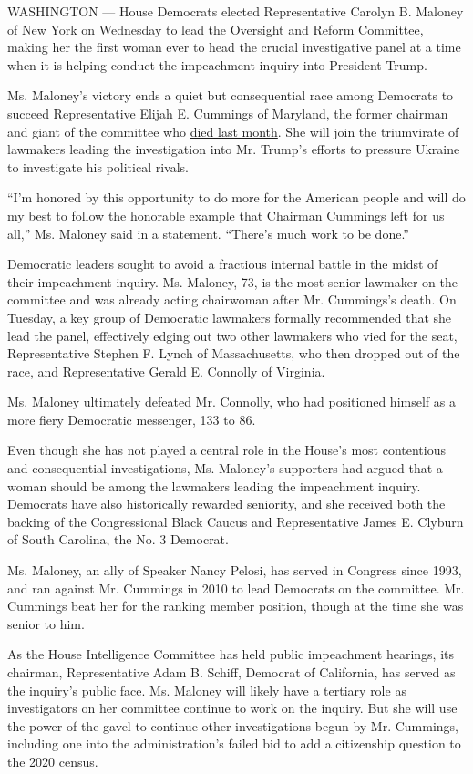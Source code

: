 WASHINGTON --- House Democrats elected Representative Carolyn B. Maloney
of New York on Wednesday to lead the Oversight and Reform Committee,
making her the first woman ever to head the crucial investigative panel
at a time when it is helping conduct the impeachment inquiry into
President Trump.

Ms. Maloney's victory ends a quiet but consequential race among
Democrats to succeed Representative Elijah E. Cummings of Maryland, the
former chairman and giant of the committee who
\href{https://www.nytimes.com/2019/10/17/us/politics/elijah-cummings-death-illness.html}{died
last month}. She will join the triumvirate of lawmakers leading the
investigation into Mr. Trump's efforts to pressure Ukraine to
investigate his political rivals.

``I'm honored by this opportunity to do more for the American people and
will do my best to follow the honorable example that Chairman Cummings
left for us all,'' Ms. Maloney said in a statement. ``There's much work
to be done.''

Democratic leaders sought to avoid a fractious internal battle in the
midst of their impeachment inquiry. Ms. Maloney, 73, is the most senior
lawmaker on the committee and was already acting chairwoman after Mr.
Cummings's death. On Tuesday, a key group of Democratic lawmakers
formally recommended that she lead the panel, effectively edging out two
other lawmakers who vied for the seat, Representative Stephen F. Lynch
of Massachusetts, who then dropped out of the race, and Representative
Gerald E. Connolly of Virginia.

Ms. Maloney ultimately defeated Mr. Connolly, who had positioned himself
as a more fiery Democratic messenger, 133 to 86.

Even though she has not played a central role in the House's most
contentious and consequential investigations, Ms. Maloney's supporters
had argued that a woman should be among the lawmakers leading the
impeachment inquiry. Democrats have also historically rewarded
seniority, and she received both the backing of the Congressional Black
Caucus and Representative James E. Clyburn of South Carolina, the No. 3
Democrat.

Ms. Maloney, an ally of Speaker Nancy Pelosi, has served in Congress
since 1993, and ran against Mr. Cummings in 2010 to lead Democrats on
the committee. Mr. Cummings beat her for the ranking member position,
though at the time she was senior to him.

As the House Intelligence Committee has held public impeachment
hearings, its chairman, Representative Adam B. Schiff, Democrat of
California, has served as the inquiry's public face. Ms. Maloney will
likely have a tertiary role as investigators on her committee continue
to work on the inquiry. But she will use the power of the gavel to
continue other investigations begun by Mr. Cummings, including one into
the administration's failed bid to add a citizenship question to the
2020 census.

